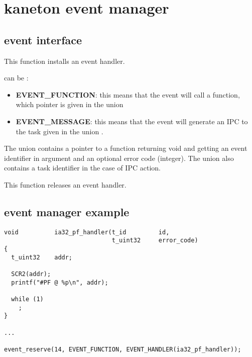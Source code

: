 \section{kaneton event manager}

\subsection*{event interface}

	 {
	   This function installs an event handler.

	    can be :
	   \begin{itemize}
	     \item
	       \textbf{EVENT\_FUNCTION}: this means that the event will
	       call a function, which pointer is given in the union
	     \item
	       \textbf{EVENT\_MESSAGE}: this means that the event will
	       generate an IPC to the task given in the union
	       .
	   \end{itemize}

	   The union  contains a pointer to a
	   function returning void and getting an event identifier in
	   argument and an optional error code (integer). The union
	   also contains a task identifier in the case of IPC action.
	 }

	 {
	   This function releases an event handler.
	 }

\subsection*{event manager example}

\begin{verbatim}
void          ia32_pf_handler(t_id         id,
                              t_uint32     error_code)
{
  t_uint32    addr;

  SCR2(addr);
  printf("#PF @ %p\n", addr);

  while (1)
    ;
}

...

event_reserve(14, EVENT_FUNCTION, EVENT_HANDLER(ia32_pf_handler));
\end{verbatim}

\newpage

